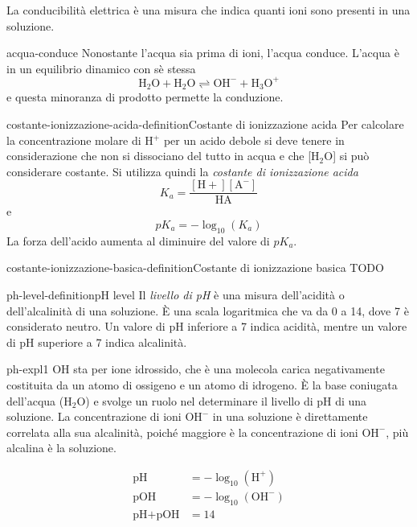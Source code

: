 \documentclass[preview]{standalone}
\begin{document}
\begin{plainhtml}
    La conducibilità elettrica è una misura
    che indica quanti ioni sono presenti in una soluzione.
\end{plainhtml}

\begin{snippet}{acqua-conduce}
    Nonostante l'acqua sia prima di ioni, l'acqua conduce.
    L'acqua è in un equilibrio dinamico con sè stessa
    \[
        \text{H}_2\text{O} + \text{H}_2\text{O} \rightleftharpoons \text{OH}^- + \text{H}_3\text{O}^+
    \]
    e questa minoranza di prodotto permette la conduzione.
\end{snippet}

\begin{snippetdefinition}{costante-ionizzazione-acida-definition}{Costante di ionizzazione acida}
    Per calcolare la concentrazione molare di H\({}^+\) per un acido
    debole si deve tenere in considerazione che non si
    dissociano del tutto in acqua e che [H\({}_2\)O] si può
    considerare costante.
    Si utilizza quindi la \textit{costante di ionizzazione acida}
    \[
        K_a = \frac{[\text{H}+][\text{A}^-]}{\text{HA}}
    \]
    e
    \[
        pK_a=-\log_{10}(K_a)
    \]
    La forza dell'acido aumenta al diminuire del valore di
    \(pK_a\).
\end{snippetdefinition}

\begin{snippetdefinition}{costante-ionizzazione-basica-definition}{Costante di ionizzazione basica}
    TODO
\end{snippetdefinition}

\begin{snippetdefinition}{ph-level-definition}{pH level}
    Il \textit{livello di pH} è una misura dell'acidità o dell'alcalinità di una soluzione.
    È una scala logaritmica che va da 0 a 14, dove 7 è considerato neutro.
    Un valore di pH inferiore a 7 indica acidità, mentre un valore di pH superiore a 7 indica alcalinità.
\end{snippetdefinition}

\begin{snippet}{ph-expl1}
    OH sta per ione idrossido, che è una molecola carica negativamente costituita da un atomo di ossigeno e un atomo di idrogeno.
    È la base coniugata dell'acqua (\(\text{H}_2\text{O}\)) e svolge un ruolo nel determinare il livello di pH di una soluzione.
    La concentrazione di ioni \(\text{OH}^-\) in una soluzione è direttamente correlata alla sua alcalinità,
    poiché maggiore è la concentrazione di ioni \(\text{OH}^-\), più alcalina è la soluzione.

    \begin{align*}
        \text{pH} &= - \log_{10}(\text{H}^+) \\
        \text{pOH} &= - \log_{10}(\text{OH}^-) \\
        \text{pH} + \text{pOH} &= 14 \\
    \end{align*}
    \vspace{-1.25cm}
\end{snippet}
\end{document}
